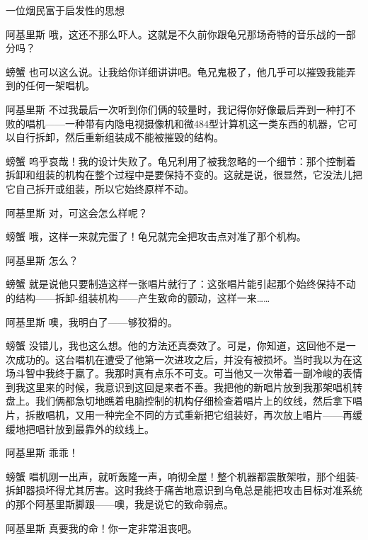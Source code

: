 \begin{dialog}{一位烟民富于启发性的思想}
\begin{dialogue}
\item[阿基里斯]哦，这还不那么吓人。这就是不久前你跟龟兄那场奇特的音乐战的一部分吗？

\item[螃蟹]也可以这么说。让我给你详细讲讲吧。龟兄鬼极了，他几乎可以摧毁我能弄到的任何一架唱机。

\item[阿基里斯]不过我最后一次听到你们俩的较量时，我记得你好像最后弄到一种打不败的唱机——一种带有内隐电视摄像机和微484型计算机这一类东西的机器，它可以自行拆卸，然后重新组装成不能被摧毁的结构。

\item[螃蟹]呜乎哀哉！我的设计失败了。龟兄利用了被我忽略的一个细节：那个控制着拆卸和组装的机构在整个过程中是要保持不变的。这就是说，很显然，它没法儿把它自己拆开或组装，所以它始终原样不动。

\item[阿基里斯]对，可这会怎么样呢？

\item[螃蟹]哦，这样一来就完蛋了！龟兄就完全把攻击点对准了那个机构。

\item[阿基里斯]怎么？

\item[螃蟹]就是说他只要制造这样一张唱片就行了：这张唱片能引起那个始终保持不动的结构——拆卸-组装机构——产生致命的颤动，这样一来……

\item[阿基里斯]噢，我明白了——够狡猾的。

\item[螃蟹]没错儿，我也这么想。他的方法还真奏效了。可是，你知道，这回他不是一次成功的。这台唱机在遭受了他第一次进攻之后，并没有被损坏。当时我以为在这场斗智中我终于嬴了。我那时真有点乐不可支。可当他又一次带着一副冷峻的表情到我这里来的时候，我意识到这回是来者不善。我把他的新唱片放到我那架唱机转盘上。我们俩都急切地瞧着电脑控制的机构仔细检查着唱片上的纹线，然后拿下唱片，拆散唱机，又用一种完全不同的方式重新把它组装好，再次放上唱片——再缓缓地把唱针放到最靠外的纹线上。

\item[阿基里斯]乖乖！

\item[螃蟹]唱机刚一出声，就听轰隆一声，响彻全屋！整个机器都震散架啦，那个组装-拆卸器损坏得尤其厉害。这时我终于痛苦地意识到乌龟总是能把攻击目标对准系统的那个阿基里斯脚跟——噢，我是说它的致命弱点。

\item[阿基里斯]真要我的命！你一定非常沮丧吧。


\end{dialogue}
\end{dialog}
